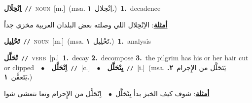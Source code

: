 \documentclass[10pt,a4paper,twoside]{article} %
\begin{document}
\begin{multicols}{2}
{\setlength\topsep{0pt}\textbf{\foreignlanguage{arabic}{اِنْحِلَال}}\ {\color{gray}\texttt{//}\color{black}}\ \textsc{noun}\ [m.]\ \color{gray}(msa. \foreignlanguage{arabic}{اِنْحِلال}~\foreignlanguage{arabic}{\textbf{١.}})\color{black}\ \textbf{1.}~decadence\  \begin{flushright}\color{gray}\foreignlanguage{arabic}{\textbf{\underline{\foreignlanguage{arabic}{أمثلة}}}: الاِنْحِلال اللي وصلته بعض البلدان العربية مخزي جداً}\end{flushright}\color{black}} \vspace{2mm}

{\setlength\topsep{0pt}\textbf{\foreignlanguage{arabic}{تَحْلِيل}}\ {\color{gray}\texttt{//}\color{black}}\ \textsc{noun}\ [m.]\ \color{gray}(msa. \foreignlanguage{arabic}{تَحْلِيل}~\foreignlanguage{arabic}{\textbf{١.}})\color{black}\ \textbf{1.}~analysis\ } \vspace{2mm}

{\setlength\topsep{0pt}\textbf{\foreignlanguage{arabic}{تْحَلَّل}}\ {\color{gray}\texttt{//}\color{black}}\ \textsc{verb}\ [p.]\ \textbf{1.}~decay  \textbf{2.}~decompose  \textbf{3.}~the pilgrim has his or her hair cut or clipped\ \ $\bullet$\ \ \setlength\topsep{0pt}\textbf{\foreignlanguage{arabic}{اِتْحَلَّل}}\ {\color{gray}\texttt{//}\color{black}}\ [c.]\ \ $\bullet$\ \ \setlength\topsep{0pt}\textbf{\foreignlanguage{arabic}{يِتْحَلَّل}}\ {\color{gray}\texttt{//}\color{black}}\ [i.]\ \color{gray}(msa. \foreignlanguage{arabic}{يَتَحَلَّل من الإِجرام}~\foreignlanguage{arabic}{\textbf{٢.}}  \foreignlanguage{arabic}{يَتَعفَّن}~\foreignlanguage{arabic}{\textbf{١.}})\color{black}\  \begin{flushright}\color{gray}\foreignlanguage{arabic}{\textbf{\underline{\foreignlanguage{arabic}{أمثلة}}}: شوف كيف الخبز بدأ يِتْحَلَّل\ $\bullet$\ \  اِتْحَلَّل من الإِحرام وتعا نتعشى شوا}\end{flushright}\color{black}} \vspace{2mm}


\end{multicols}
\end{document}
